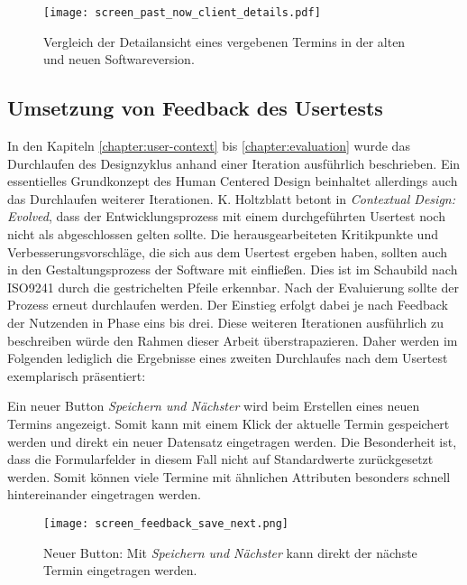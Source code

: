 \begin{figure}[H]
    \caption{Vergleich der Detailansicht eines vergebenen Termins in der alten und neuen Softwareversion.}
    \centering
    \texttt{[image: screen\_past\_now\_client\_details.pdf]}
\end{figure}

\subsection*{Umsetzung von Feedback des Usertests}
\label{paragraph:weitereIteration}

In den Kapiteln \ref{chapter:user-context} bis \ref{chapter:evaluation} wurde
das Durchlaufen des Designzyklus anhand einer Iteration ausführlich
beschrieben. Ein essentielles Grundkonzept des Human Centered Design beinhaltet
allerdings auch das Durchlaufen weiterer Iterationen\cite{hcd}. K. Holtzblatt
betont in \textit{Contextual Design: Evolved}, dass der Entwicklungsprozess mit
einem durchgeführten Usertest noch nicht als abgeschlossen gelten sollte. Die
herausgearbeiteten Kritikpunkte und Verbesserungsvorschläge, die sich aus dem
Usertest ergeben haben, sollten auch in den Gestaltungsprozess der Software mit
einfließen\cite{holtzblattCDEvolved}. Dies ist im Schaubild nach ISO9241 durch
die gestrichelten Pfeile erkennbar. Nach der Evaluierung sollte der Prozess
erneut durchlaufen werden. Der Einstieg erfolgt dabei je nach Feedback der
Nutzenden in Phase eins bis drei\cite{ISO9241}. Diese weiteren Iterationen
ausführlich zu beschreiben würde den Rahmen dieser Arbeit überstrapazieren.
Daher werden im Folgenden lediglich die Ergebnisse eines zweiten Durchlaufes
nach dem Usertest exemplarisch präsentiert:

Ein neuer Button \textit{Speichern und Nächster} wird beim Erstellen eines
neuen Termins angezeigt. Somit kann mit einem Klick der aktuelle Termin
gespeichert werden und direkt ein neuer Datensatz eingetragen werden. Die
Besonderheit ist, dass die Formularfelder in diesem Fall nicht auf
Standardwerte zurückgesetzt werden. Somit können viele Termine mit ähnlichen
Attributen besonders schnell hintereinander eingetragen werden.

\begin{figure}[H]
    \caption{Neuer Button: Mit \textit{Speichern und Nächster} kann direkt der nächste Termin eingetragen werden.}
    \centering
    \texttt{[image: screen\_feedback\_save\_next.png]}
\end{figure}

